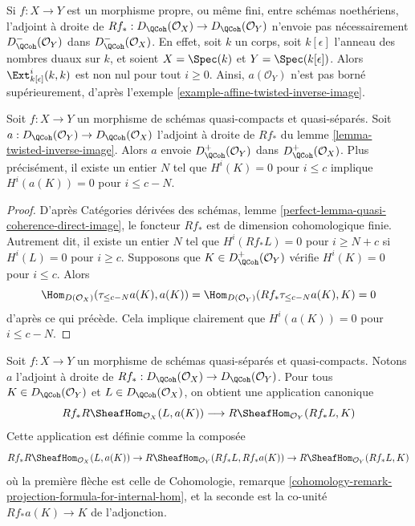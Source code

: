 \begin{example}
\label{example-does-not-preserve-bounded-above}
Si $f : X \to Y$ est un morphisme propre, ou même fini, entre schémas noethériens, l'adjoint à droite de $Rf_* : D_\QCoh(\mathcal{O}_X) \to D_\QCoh(\mathcal{O}_Y)$ n'envoie pas nécessairement $D_\QCoh^-(\mathcal{O}_Y)$ dans $D_\QCoh^-(\mathcal{O}_X)$. En effet, soit $k$ un corps, soit $k[\epsilon]$ l'anneau des nombres duaux sur $k$, et soient $X = \Spec(k)$ et $Y = \Spec(k[\epsilon])$. Alors $\Ext^i_{k[\epsilon]}(k, k)$ est non nul pour tout $i \geq 0$. Ainsi, $a(\mathcal{O}_Y)$ n'est pas borné supérieurement, d'après l'exemple \ref{example-affine-twisted-inverse-image}.
\end{example}

\begin{lemma}
\label{lemma-twisted-inverse-image-bounded-below}
Soit $f : X \to Y$ un morphisme de schémas quasi-compacts et quasi-séparés. Soit $a : D_\QCoh(\mathcal{O}_Y) \to D_\QCoh(\mathcal{O}_X)$ l'adjoint à droite de $Rf_*$ du lemme \ref{lemma-twisted-inverse-image}. Alors $a$ envoie $D^+_\QCoh(\mathcal{O}_Y)$ dans $D^+_\QCoh(\mathcal{O}_X)$. Plus précisément, il existe un entier $N$ tel que $H^i(K) = 0$ pour $i \leq c$ implique $H^i(a(K)) = 0$ pour $i \leq c - N$.
\end{lemma}

\begin{proof}
D'après Catégories dérivées des schémas, lemme \ref{perfect-lemma-quasi-coherence-direct-image}, le foncteur $Rf_*$ est de dimension cohomologique finie. Autrement dit, il existe un entier $N$ tel que $H^i(Rf_*L) = 0$ pour $i \geq N + c$ si $H^i(L) = 0$ pour $i \geq c$. Supposons que $K \in D^+_\QCoh(\mathcal{O}_Y)$ vérifie $H^i(K) = 0$ pour $i \leq c$. Alors
$$
\Hom_{D(\mathcal{O}_X)}(\tau_{\leq c - N}a(K), a(K)) =
\Hom_{D(\mathcal{O}_Y)}(Rf_*\tau_{\leq c - N}a(K), K) = 0
$$
d'après ce qui précède. Cela implique clairement que $H^i(a(K)) = 0$ pour $i \leq c - N$.
\end{proof}

\noindent
Soit $f : X \to Y$ un morphisme de schémas quasi-séparés et quasi-compacts. Notons $a$ l'adjoint à droite de $Rf_* : D_\QCoh(\mathcal{O}_X) \to D_\QCoh(\mathcal{O}_Y)$. Pour tous $K \in D_\QCoh(\mathcal{O}_Y)$ et $L \in D_\QCoh(\mathcal{O}_X)$, on obtient une application canonique
\begin{equation}
\label{equation-sheafy-trace}
Rf_*R\SheafHom_{\mathcal{O}_X}(L, a(K))
\longrightarrow
R\SheafHom_{\mathcal{O}_Y}(Rf_*L, K)
\end{equation}
Cette application est définie comme la composée
$$
Rf_*R\SheafHom_{\mathcal{O}_X}(L, a(K)) \to
R\SheafHom_{\mathcal{O}_Y}(Rf_*L, Rf_*a(K)) \to
R\SheafHom_{\mathcal{O}_Y}(Rf_*L, K)
$$
où la première flèche est celle de Cohomologie, remarque \ref{cohomology-remark-projection-formula-for-internal-hom}, et la seconde est la co-unité $Rf_*a(K) \to K$ de l'adjonction.

